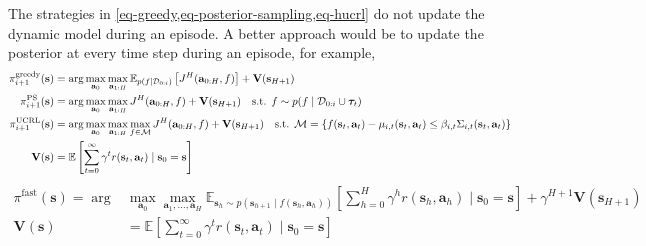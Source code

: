 \documentclass{article}
\newcommand{\state}{\ensuremath{\mathbf{s}}}
\newcommand{\action}{\ensuremath{\mathbf{a}}}
\newcommand{\discount}{\ensuremath{\gamma}}
\newcommand{\dataset}{\ensuremath{\mathcal{D}}}
\newcommand{\horizon}{\ensuremath{h}}
\newcommand{\Horizon}{\ensuremath{H}}
\newcommand{\rewardFn}{\ensuremath{r}}
\newcommand{\transitionFn}{\ensuremath{f}}
\newcommand{\stateValueFn}{\ensuremath{\mathbf{V}}}
\newcommand{\policy}{\ensuremath{\pi}}
\begin{document}
The strategies in \cref{eq-greedy,eq-posterior-sampling,eq-hucrl} do not update the dynamic model during an episode.
A better approach would be to update the posterior at every time step during an episode, for example,
\begin{subequations}
\begin{align} \label{eq-fast-update-mpc}
  \policy_{i+1}^{\text{greedy}}(\state) &= \arg \max_{\action_{0}} \max_{\action_{1:\Horizon}}
\E_{p(\transitionFn \mid \dataset_{0:i})} \left[J^{\Horizon}(\action_{0:\Horizon}, \transitionFn) \right] + \stateValueFn(\state_{\Horizon+1}) \\
  \policy_{i+1}^{\text{PS}}(\state) &= \arg \max_{\action_{0}} \max_{\action_{1:\Horizon}}
J^{\Horizon}(\action_{0:\Horizon}, \transitionFn) + \stateValueFn(\state_{\Horizon+1}) \quad \text{s.t. } \transitionFn \sim p(\transitionFn \mid \dataset_{0:i} \cup \bm\tau_{t}) \\
  \policy_{i+1}^{\text{UCRL}}(\state) &= \arg \max_{\action_{0}} \max_{\action_{1:\Horizon}} \max_{\transitionFn \in \mathcal{M}}
J^{\Horizon}(\action_{0:\Horizon}, \transitionFn) + \stateValueFn(\state_{\Horizon+1}) \quad \text{s.t. } \mathcal{M} = \{\transitionFn(\state_{t},\action_{t}) - \mu_{i,t}(\state_{t},\action_{t}) \leq \beta_{i,t} \Sigma_{i,t}(\state_{t}, \action_{t})\} \\
  \stateValueFn(\state) &= \mathbb{E} \left[ \sum_{t=0}^{\infty}     \discount^{t} \rewardFn(\state_{t},\action_{t}) \mid \state_{0}=\state \right] \label{eq-value-fn}
\end{align}
\end{subequations}
\begin{subequations}
\begin{align} \label{eq-fast-update-mpc-old}
  \policy^{\text{fast}}(\state) = \arg &\max_{\action_{0}} \max_{\action_{1}, \ldots, \action_{\Horizon}}
  \mathbb{E}_{\state_{\horizon} \sim p(\state_{\horizon+1} \mid \transitionFn(\state_{\horizon}, \action_{\horizon}))} \left[ \sum_{\horizon=0}^{\Horizon}     \discount^{\horizon} \rewardFn(\state_{\horizon},\action_{\horizon}) \mid \state_{0}=\state \right] + \discount^{\Horizon+1} \stateValueFn(\state_{\Horizon+1}) \\
  \stateValueFn(\state) &= \mathbb{E} \left[ \sum_{t=0}^{\infty}     \discount^{t} \rewardFn(\state_{t},\action_{t}) \mid \state_{0}=\state \right] \label{eq-fast-update-mpc}
\end{align}
\end{subequations}
\end{document}
